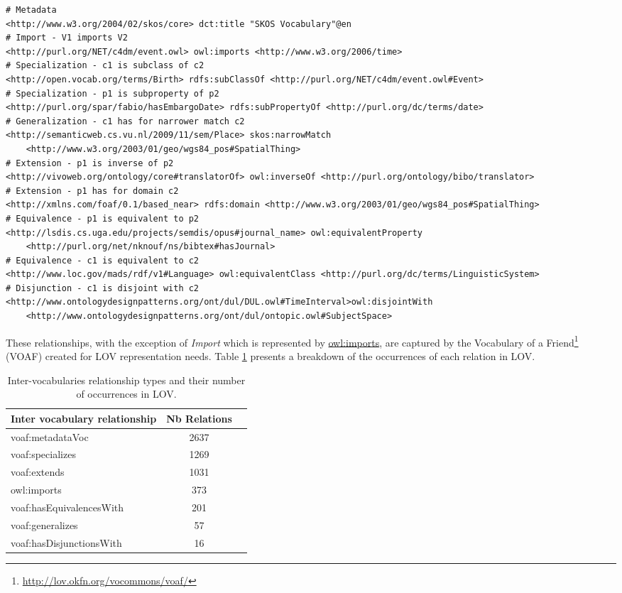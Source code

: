 \documentclass{iosart2c}
\begin{document}
\begin{lstlisting}[float=*,basicstyle=\tiny,label={list:voaf}, language=turtle, caption={Examples of Inter-vocabulary relationships.}]
# Metadata
<http://www.w3.org/2004/02/skos/core> dct:title "SKOS Vocabulary"@en
# Import - V1 imports V2
<http://purl.org/NET/c4dm/event.owl> owl:imports <http://www.w3.org/2006/time>
# Specialization - c1 is subclass of c2
<http://open.vocab.org/terms/Birth> rdfs:subClassOf <http://purl.org/NET/c4dm/event.owl#Event>
# Specialization - p1 is subproperty of p2  
<http://purl.org/spar/fabio/hasEmbargoDate> rdfs:subPropertyOf <http://purl.org/dc/terms/date>
# Generalization - c1 has for narrower match c2 
<http://semanticweb.cs.vu.nl/2009/11/sem/Place> skos:narrowMatch 
    <http://www.w3.org/2003/01/geo/wgs84_pos#SpatialThing>
# Extension - p1 is inverse of p2
<http://vivoweb.org/ontology/core#translatorOf> owl:inverseOf <http://purl.org/ontology/bibo/translator>
# Extension - p1 has for domain c2
<http://xmlns.com/foaf/0.1/based_near> rdfs:domain <http://www.w3.org/2003/01/geo/wgs84_pos#SpatialThing>
# Equivalence - p1 is equivalent to p2
<http://lsdis.cs.uga.edu/projects/semdis/opus#journal_name> owl:equivalentProperty 
    <http://purl.org/net/nknouf/ns/bibtex#hasJournal>
# Equivalence - c1 is equivalent to c2 
<http://www.loc.gov/mads/rdf/v1#Language> owl:equivalentClass <http://purl.org/dc/terms/LinguisticSystem>
# Disjunction - c1 is disjoint with c2
<http://www.ontologydesignpatterns.org/ont/dul/DUL.owl#TimeInterval>owl:disjointWith 
    <http://www.ontologydesignpatterns.org/ont/dul/ontopic.owl#SubjectSpace>
\end{lstlisting}

These relationships, with the exception of \emph{Import} which is represented by \url{owl:imports}, are captured by the Vocabulary of a Friend\footnote{\url{http://lov.okfn.org/vocommons/voaf/}} (VOAF) created for LOV representation needs. Table \ref{tab:voaf} presents a breakdown of the occurrences of each relation in LOV.

\begin{table}[h!tb]
\caption{Inter-vocabularies relationship types and their number of occurrences in LOV.}
\begin{tabular}{lcc}
\hline
\textbf{Inter vocabulary relationship} & \textbf{Nb Relations} \\ \hline
voaf:metadataVoc & 2637 \\
voaf:specializes & 1269 \\
voaf:extends & 1031 \\
owl:imports & 373 \\
voaf:hasEquivalencesWith & 201 \\
voaf:generalizes & 57 \\
voaf:hasDisjunctionsWith & 16 \\
\hline  
\end{tabular}
\label{tab:voaf}
\end{table}
\end{document}
